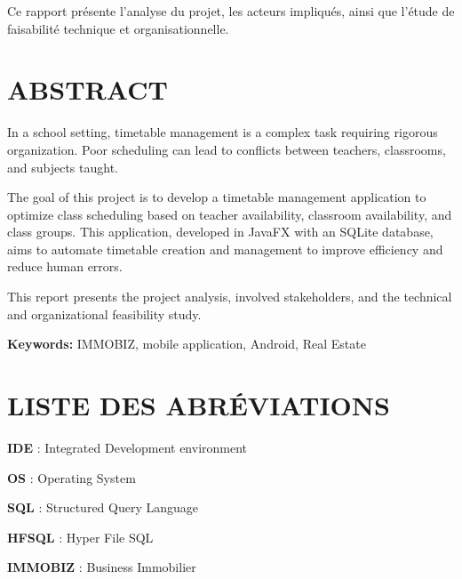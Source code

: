 \documentclass[english,12pt,a4paper]{report}
\begin{document}
\begin{spacing}{1.5}
Ce rapport présente l’analyse du projet, les acteurs impliqués, ainsi que l’étude de faisabilité technique et organisationnelle.
\bigskip 
\bigskip
\par 

\chapter*{ABSTRACT}
\hspace{1.2cm}
In a school setting, timetable management is a complex task requiring rigorous organization. Poor scheduling can lead to conflicts between teachers, classrooms, and subjects taught.

The goal of this project is to develop a timetable management application to optimize class scheduling based on teacher availability, classroom availability, and class groups. This application, developed in JavaFX with an SQLite database, aims to automate timetable creation and management to improve efficiency and reduce human errors.

This report presents the project analysis, involved stakeholders, and the technical and organizational feasibility study.


\bigskip 
\bigskip
\par 

\textbf{Keywords:} IMMOBIZ, mobile application, Android, Real Estate 
\chapter*{LISTE DES ABRÉVIATIONS}
\textbf{IDE} : Integrated Development environment 

\textbf{OS} : 	 Operating System 

\textbf{SQL} :  	Structured Query Language

\textbf{HFSQL} : Hyper File SQL

\textbf{IMMOBIZ} : Business Immobilier 
\end{spacing}

\tableofcontents

\cleardoublepage
{}

\listoffigures

\cleardoublepage
{}

\listoftables
\end{document}

